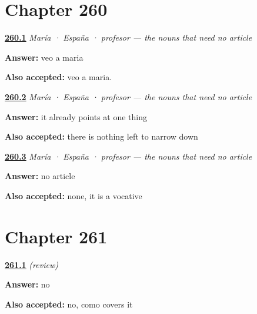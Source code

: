 \section*{Chapter 260}

\noindent\begin{minipage}[t]{\linewidth}
\raggedright
\hyperlink{review-ES-C66-nombres-propios-name}{\textbf{260.1}} \emph{María · España · profesor — the nouns that need no article}\par
\small \textbf{Answer:} veo a maria\par
\footnotesize \textbf{Also accepted:} veo a maria.
\end{minipage}\par\medskip

\noindent\begin{minipage}[t]{\linewidth}
\raggedright
\hyperlink{review-ES-C66-nombres-propios-why}{\textbf{260.2}} \emph{María · España · profesor — the nouns that need no article}\par
\small \textbf{Answer:} it already points at one thing\par
\footnotesize \textbf{Also accepted:} there is nothing left to narrow down
\end{minipage}\par\medskip

\noindent\begin{minipage}[t]{\linewidth}
\raggedright
\hyperlink{review-ES-C66-nombres-propios-title}{\textbf{260.3}} \emph{María · España · profesor — the nouns that need no article}\par
\small \textbf{Answer:} no article\par
\footnotesize \textbf{Also accepted:} none, it is a vocative
\end{minipage}\par\medskip

\section*{Chapter 261}

\noindent\begin{minipage}[t]{\linewidth}
\raggedright
\hyperlink{review-ES-C66-repaso-lo-implicito-prog}{\textbf{261.1}} \emph{(review)}\par
\small \textbf{Answer:} no\par
\footnotesize \textbf{Also accepted:} no, como covers it
\end{minipage}\par\medskip

